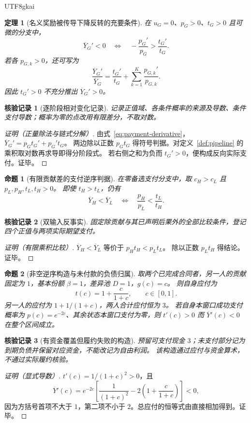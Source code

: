 \documentclass[12pt,a4paper,openany]{report}
\newtheorem{theorem}{定理}[chapter]
\newtheorem{proposition}{命题}[chapter]
\newtheorem{Certificate}{核验记录}[chapter]
\begin{document}
\begin{CJK*}{UTF8}{gkai}
\begin{theorem}[名义奖励被传导下降反转的充要条件]
\label{thm:reversal}
在 $u_G=0$、$p_G>0$、$t_G>0$ 且可微的分支中，
\[
 \overline Y_G'<0
 \quad\Longleftrightarrow\quad
 -\frac{p_G'}{p_G}>\frac{t_G'}{t_G}.
\]
若各 $p_{G,k}>0$，还可写为
\[
 \frac{\overline Y_G'}{\overline Y_G}
 =\frac{t_G'}{t_G}+\sum_{k=1}^K\frac{p_{G,k}'}{p_{G,k}}.
\]
因此 $t_G'>0$ 不充分推出 $\overline Y_G'>0$。
\end{theorem}
\begin{Certificate}[逐阶段相对变化记录]
记录正值域、各条件概率的来源及导数、条件支付导数；概率为零的点改用有限差分，不取对数。
\end{Certificate}
\begin{proof}[证明（正量除法与链式分解）]
由式~\eqref{eq:payment-derivative}，$\overline Y_G'=p_Gt_G'+p_G't_G$。
两边除以正数 $p_Gt_G$ 得符号判据。对定义~\ref{def:pipeline} 的乘积取对数再求导即得分阶段式。
若右侧之和为负而 $t_G'>0$，便构成反向实际支付。证毕。
\end{proof}

\begin{proposition}[有限贡献差的支付逆序判据]
\label{prop:finite-reversal}
在零备选支付分支中，取 $c_H>c_L$ 且 $p_L,p_H,t_L,t_H>0$。
即使 $t_H>t_L$，仍有
\[
 \overline Y_H<\overline Y_L
 \quad\Longleftrightarrow\quad
 \frac{p_H}{p_L}<\frac{t_L}{t_H}.
\]
\end{proposition}
\begin{Certificate}[双输入反事实]
固定除贡献与其已声明后果外的全部比较条件，登记四个正值与两项实际期望支付。
\end{Certificate}
\begin{proof}[证明（有限乘积比较）]
$\overline Y_H<\overline Y_L$ 等价于 $p_Ht_H<p_Lt_L$。
除以正数 $p_Lt_H$ 得结论。证毕。
\end{proof}

\begin{proposition}[非空逆序构造与未付款的负债归属]
\label{prop:reversal-example}
取两个已完成合同者，另一人的贡献固定为 $1$，基本份额 $\beta=1$，差异池 $D=1$，$g(c)=c$。
则自身应付为
\[
 t(c)=1+\frac{c}{1+c},\qquad c\in[0,1].
\]
另一人的应付为 $1+1/(1+c)$，两人合计应付恒为 $3$。
若自身本窗口成功支付概率为 $p(c)=e^{-2c}$、其余状态本窗口支付为零，则
$t'(c)>0$ 而 $\overline Y'(c)<0$ 在整个区间成立。
\end{proposition}
\begin{Certificate}[有资金覆盖但履约失败的构造]
预留可支付现金 $3$；未支付部分记为到期负债并保留对应资金，不能改记为自由利润。
该构造通过应付与资金算术，不通过实际履约核验。
\end{Certificate}
\begin{proof}[证明（显式导数）]
$t'(c)=1/(1+c)^2>0$，且
\[
 \overline Y'(c)=e^{-2c}
 \left[\frac1{(1+c)^2}-2\left(1+\frac c{1+c}\right)\right]<0,
\]
因为方括号首项不大于 $1$，第二项不小于 $2$。总应付的恒等式由直接相加得到。证毕。
\end{proof}


\end{CJK*}
\end{document}
